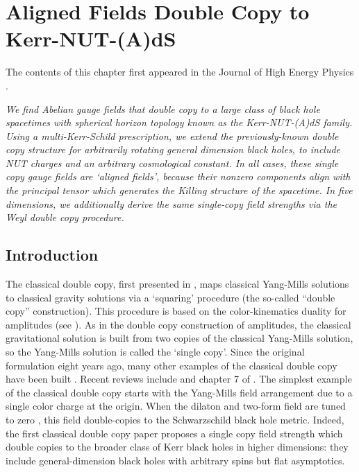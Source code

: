 \chapter{Aligned Fields Double Copy to Kerr-NUT-(A)dS} \label{chap:5D}

The contents of this chapter first appeared in the Journal of High Energy Physics \cite{Chawla:2022ogv}.

\textit{We find Abelian gauge fields that double copy to a large class of black hole spacetimes with spherical
horizon topology known as the Kerr-NUT-(A)dS family. Using a multi-Kerr-Schild prescription, we extend the
previously-known double copy structure for arbitrarily rotating general dimension black holes, to include NUT
charges and an arbitrary cosmological constant. In all cases, these single copy gauge fields are ‘aligned
fields’, because their nonzero components align with the principal tensor which generates the Killing structure of
the spacetime. In five dimensions, we additionally derive the same single-copy field strengths via the Weyl double
copy procedure. }

\section{Introduction}

The classical double copy, first presented in \cite{Monteiro:2014cda}, maps classical Yang-Mills solutions to
classical gravity solutions via a `squaring' procedure (the so-called ``double copy'' construction).
This procedure is based on the color-kinematics duality for amplitudes (see 
\cite{Bern:2022wqg,Bern:2019prr,Adamo:2022dcm}).  As in the double
copy construction of amplitudes, the classical gravitational solution is built from two copies of the classical
Yang-Mills solution, so the Yang-Mills solution is called the `single copy'.  Since the original
formulation eight years ago, many other examples of the classical double copy have been built
\cite{Luna:2015paa,Luna:2016hge,Monteiro:2018xev,Ridgway:2015fdl,Adamo:2017nia,Bahjat-Abbas:2017htu,Carrillo-Gonzalez:2017iyj,Ilderton:2018lsf,Gurses:2018ckx,CarrilloGonzalez:2019gof,Lee:2018gxc,
Lescano:2020nve,Lescano:2021ooe,Bah:2019sda,Goldberger:2019xef,Kim:2019jwm,Luna:2020adi,Keeler:2020rcv,Easson:2020esh,Berman:2018hwd,Alkac:2021seh,Mkrtchyan:2022ulc,Adamo:2022rob,Alfonsi:2020lub,Adamo:2020qru,Gonzo:2021drq}.
Recent reviews include \cite{Kosower:2022yvp} and chapter 7 of \cite{Bern:2019prr}.  
The simplest example of the classical double copy starts with the Yang-Mills field arrangement due to a single color charge at the origin.  When the dilaton and two-form field are tuned to zero \cite{Kim:2019jwm,Luna:2020adi}, this field double-copies to the Schwarzschild black hole metric.  Indeed, the first classical double copy paper \cite{Monteiro:2014cda} proposes a single copy field strength which double copies to the broader class of Kerr black holes in higher dimensions: they include general-dimension black holes with arbitrary spins but flat asymptotics.

